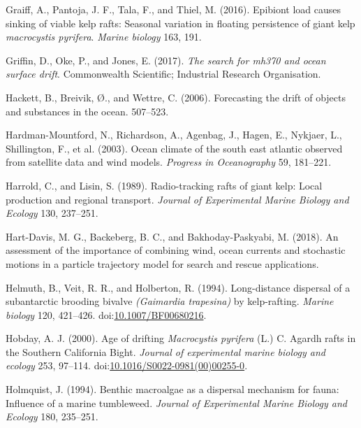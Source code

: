 \documentclass[
]{article}
\begin{document}
\leavevmode\hypertarget{ref-graiff2016}{}%
Graiff, A., Pantoja, J. F., Tala, F., and Thiel, M. (2016). Epibiont
load causes sinking of viable kelp rafts: Seasonal variation in floating
persistence of giant kelp \emph{macrocystis pyrifera}. \emph{Marine
biology} 163, 191.

\leavevmode\hypertarget{ref-griffin2017}{}%
Griffin, D., Oke, P., and Jones, E. (2017). \emph{The search for mh370
and ocean surface drift}. Commonwealth Scientific; Industrial Research
Organisation.

\leavevmode\hypertarget{ref-hackett2006}{}%
Hackett, B., Breivik, Ø., and Wettre, C. (2006). Forecasting the drift
of objects and substances in the ocean. 507--523.

\leavevmode\hypertarget{ref-hardman2003}{}%
Hardman-Mountford, N., Richardson, A., Agenbag, J., Hagen, E., Nykjaer,
L., Shillington, F., et al. (2003). Ocean climate of the south east
atlantic observed from satellite data and wind models. \emph{Progress in
Oceanography} 59, 181--221.

\leavevmode\hypertarget{ref-harrold1989}{}%
Harrold, C., and Lisin, S. (1989). Radio-tracking rafts of giant kelp:
Local production and regional transport. \emph{Journal of Experimental
Marine Biology and Ecology} 130, 237--251.

\leavevmode\hypertarget{ref-hart2018}{}%
Hart-Davis, M. G., Backeberg, B. C., and Bakhoday-Paskyabi, M. (2018).
An assessment of the importance of combining wind, ocean currents and
stochastic motions in a particle trajectory model for search and rescue
applications.

\leavevmode\hypertarget{ref-helmuth1994}{}%
Helmuth, B., Veit, R. R., and Holberton, R. (1994). Long-distance
dispersal of a subantarctic brooding bivalve \emph{(Gaimardia
trapesina)} by kelp-rafting. \emph{Marine biology} 120, 421--426.
doi:\href{https://doi.org/10.1007/BF00680216}{10.1007/BF00680216}.

\leavevmode\hypertarget{ref-hobday2000}{}%
Hobday, A. J. (2000). Age of drifting \emph{Macrocystis pyrifera} (L.)
C. Agardh rafts in the Southern California Bight. \emph{Journal of
experimental marine biology and ecology} 253, 97--114.
doi:\href{https://doi.org/10.1016/S0022-0981(00)00255-0}{10.1016/S0022-0981(00)00255-0}.

\leavevmode\hypertarget{ref-holmquist1994}{}%
Holmquist, J. (1994). Benthic macroalgae as a dispersal mechanism for
fauna: Influence of a marine tumbleweed. \emph{Journal of Experimental
Marine Biology and Ecology} 180, 235--251.
\end{document}

